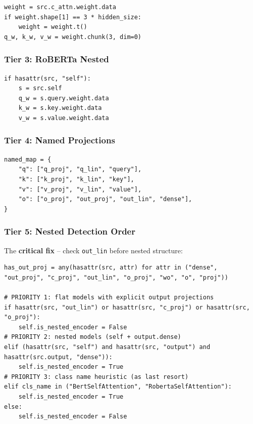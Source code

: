 \begin{lstlisting}
weight = src.c_attn.weight.data
if weight.shape[1] == 3 * hidden_size:
    weight = weight.t()
q_w, k_w, v_w = weight.chunk(3, dim=0)
\end{lstlisting}

\subsubsection{Tier 3: RoBERTa Nested}

\begin{lstlisting}
if hasattr(src, "self"):
    s = src.self
    q_w = s.query.weight.data
    k_w = s.key.weight.data
    v_w = s.value.weight.data
\end{lstlisting}

\subsubsection{Tier 4: Named Projections}

\begin{lstlisting}
named_map = {
    "q": ["q_proj", "q_lin", "query"],
    "k": ["k_proj", "k_lin", "key"],
    "v": ["v_proj", "v_lin", "value"],
    "o": ["o_proj", "out_proj", "out_lin", "dense"],
}
\end{lstlisting}

\subsubsection{Tier 5: Nested Detection Order}

The \textbf{critical fix} -- check \texttt{out\_lin} before nested structure:

\begin{lstlisting}
has_out_proj = any(hasattr(src, attr) for attr in ("dense", "out_proj", "c_proj", "out_lin", "o_proj", "wo", "o", "proj"))

# PRIORITY 1: flat models with explicit output projections
if hasattr(src, "out_lin") or hasattr(src, "c_proj") or hasattr(src, "o_proj"):
    self.is_nested_encoder = False
# PRIORITY 2: nested models (self + output.dense)
elif (hasattr(src, "self") and hasattr(src, "output") and hasattr(src.output, "dense")):
    self.is_nested_encoder = True
# PRIORITY 3: class name heuristic (as last resort)
elif cls_name in ("BertSelfAttention", "RobertaSelfAttention"):
    self.is_nested_encoder = True
else:
    self.is_nested_encoder = False
\end{lstlisting}

